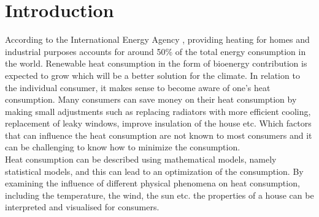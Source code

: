 \chapter{Introduction}
\noindent According to the International Energy Agency \cite{iea}, providing heating for homes and industrial purposes accounts for around 50\% of the total energy consumption in the world. Renewable heat consumption in the form of bioenergy contribution is expected to grow which will be a better solution for the climate. In relation to the individual consumer, it makes sense to become aware of one's heat consumption. Many consumers can save money on their heat consumption by making small adjustments such as replacing radiators with more efficient cooling, replacement of leaky windows, improve insulation of the house etc. Which factors that can influence the heat consumption are not known to most consumers and it can be challenging to know how to minimize the consumption. \\

\noindent Heat consumption can be described using mathematical models, namely statistical models, and this can lead to an optimization of the consumption. 
By examining the influence of different physical phenomena on heat consumption, including the temperature, the wind, the sun etc. the properties of a house can be interpreted and visualised for consumers.


